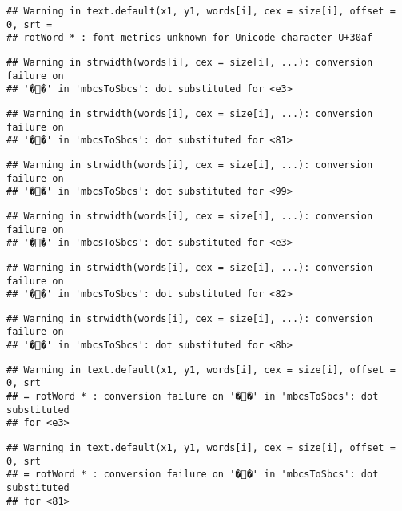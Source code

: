 \documentclass[]{article}
\begin{document}
\begin{verbatim}
## Warning in text.default(x1, y1, words[i], cex = size[i], offset = 0, srt =
## rotWord * : font metrics unknown for Unicode character U+30af
\end{verbatim}

\begin{verbatim}
## Warning in strwidth(words[i], cex = size[i], ...): conversion failure on
## '��' in 'mbcsToSbcs': dot substituted for <e3>
\end{verbatim}

\begin{verbatim}
## Warning in strwidth(words[i], cex = size[i], ...): conversion failure on
## '��' in 'mbcsToSbcs': dot substituted for <81>
\end{verbatim}

\begin{verbatim}
## Warning in strwidth(words[i], cex = size[i], ...): conversion failure on
## '��' in 'mbcsToSbcs': dot substituted for <99>
\end{verbatim}

\begin{verbatim}
## Warning in strwidth(words[i], cex = size[i], ...): conversion failure on
## '��' in 'mbcsToSbcs': dot substituted for <e3>
\end{verbatim}

\begin{verbatim}
## Warning in strwidth(words[i], cex = size[i], ...): conversion failure on
## '��' in 'mbcsToSbcs': dot substituted for <82>
\end{verbatim}

\begin{verbatim}
## Warning in strwidth(words[i], cex = size[i], ...): conversion failure on
## '��' in 'mbcsToSbcs': dot substituted for <8b>
\end{verbatim}

\begin{verbatim}
## Warning in text.default(x1, y1, words[i], cex = size[i], offset = 0, srt
## = rotWord * : conversion failure on '��' in 'mbcsToSbcs': dot substituted
## for <e3>
\end{verbatim}

\begin{verbatim}
## Warning in text.default(x1, y1, words[i], cex = size[i], offset = 0, srt
## = rotWord * : conversion failure on '��' in 'mbcsToSbcs': dot substituted
## for <81>
\end{verbatim}
\end{document}
